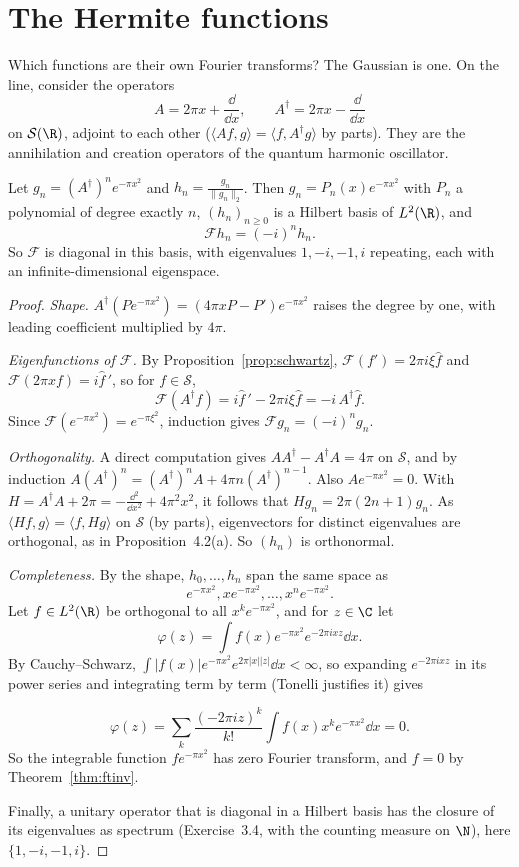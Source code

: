 \section{The Hermite functions}

Which functions are their own Fourier transforms? The Gaussian is one. On the line, consider the operators
\[A=2\pi x+\frac{\dd}{\dd x},\qquad A^\dagger=2\pi x-\frac{\dd}{\dd x}\]
on $\mathcal S(\R)$, adjoint to each other ($\langle Af,g\rangle=\langle f,A^\dagger g\rangle$ by parts). They are the annihilation and creation operators of the quantum harmonic oscillator.

\begin{theorem}\label{thm:hermite}
Let $g_n=(A^\dagger)^ne^{-\pi x^2}$ and $h_n=\frac{g_n}{\|g_n\|_2}$. Then $g_n=P_n(x)e^{-\pi x^2}$ with $P_n$ a polynomial of degree exactly $n$, $(h_n)_{n\ge0}$ is a Hilbert basis of $L^2(\R)$, and
\[\mathcal Fh_n=(-i)^nh_n.\]
So $\mathcal F$ is diagonal in this basis, with eigenvalues $1,-i,-1,i$ repeating, each with an infinite-dimensional eigenspace.
\end{theorem}
\begin{proof}
\emph{Shape.} $A^\dagger(Pe^{-\pi x^2})=(4\pi xP-P')e^{-\pi x^2}$ raises the degree by one, with leading coefficient multiplied by $4\pi$.

\emph{Eigenfunctions of $\mathcal F$.} By Proposition~\ref{prop:schwartz}, $\mathcal F(f')=2\pi i\xi\hat f$ and $\mathcal F(2\pi xf)=i\hat f\,'$, so for $f\in\mathcal S$,
\[\mathcal F(A^\dagger f)=i\hat f\,'-2\pi i\xi\hat f=-i\,A^\dagger\hat f.\]
Since $\mathcal F(e^{-\pi x^2})=e^{-\pi\xi^2}$, induction gives $\mathcal Fg_n=(-i)^ng_n$.

\emph{Orthogonality.} A direct computation gives $AA^\dagger-A^\dagger A=4\pi$ on $\mathcal S$, and by induction $A(A^\dagger)^n=(A^\dagger)^nA+4\pi n(A^\dagger)^{n-1}$. Also $Ae^{-\pi x^2}=0$. With $H=A^\dagger A+2\pi=-\frac{\dd^2}{\dd x^2}+4\pi^2x^2$,
it follows that $Hg_n=2\pi(2n+1)g_n$. As $\langle Hf,g\rangle=\langle f,Hg\rangle$ on $\mathcal S$ (by parts), eigenvectors for distinct eigenvalues are orthogonal, as in Proposition~4.2(a). So $(h_n)$ is orthonormal.

\emph{Completeness.} By the shape, $h_0,\dots,h_n$ span the same space as
\[
e^{-\pi x^2},xe^{-\pi x^2},\dots,x^ne^{-\pi x^2}.
\] Let $f\in L^2(\R)$ be orthogonal to all $x^ke^{-\pi x^2}$, and for $z\in\C$ let
\[\varphi(z)=\int f(x)e^{-\pi x^2}e^{-2\pi ixz}\dd x.\]
By Cauchy--Schwarz, $\int|f(x)|e^{-\pi x^2}e^{2\pi|x||z|}\dd x<\infty$, so expanding $e^{-2\pi ixz}$ in its power series and integrating term by term (Tonelli justifies it) gives

\[
\varphi(z)=\sum_k\frac{(-2\pi iz)^k}{k!}\int f(x)x^ke^{-\pi x^2}\dd x=0.
\]
So the integrable function $fe^{-\pi x^2}$ has zero Fourier transform, and $f=0$ by Theorem~\ref{thm:ftinv}.

Finally, a unitary operator that is diagonal in a Hilbert basis has the closure of its eigenvalues as spectrum (Exercise~3.4, with the counting measure on $\N$), here $\{1,-i,-1,i\}$.
\end{proof}

